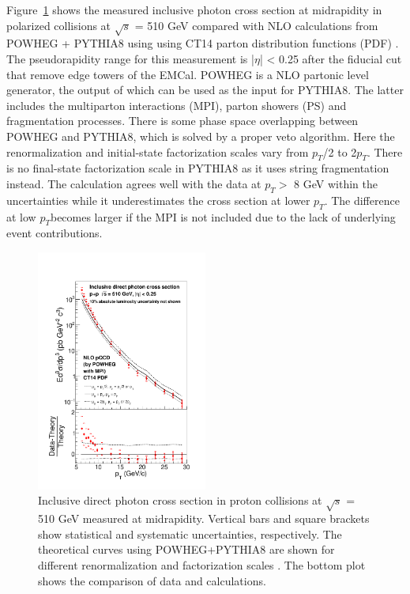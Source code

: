 \documentclass[twocolumn,letterpaper,aps,prl,longbibliography,superscriptaddress,floatfix]{revtex4-2}
\newcommand{\pT}{\ensuremath{p_T}}
\begin{document}
Figure~\ref{fig:inc} shows the measured inclusive photon cross section at midrapidity in polarized collisions at $\sqrt{s}$ = 510 GeV compared with NLO calculations from POWHEG + PYTHIA8 \cite{Nason_2004, Frixione_2007, Alioli2010, Jezo2016, Klasen2018} using using CT14 parton distribution functions (PDF) \cite{PhysRevD.93.033006}. The pseudorapidity range for this measurement is |$\eta$| < 0.25 after the fiducial cut that remove edge towers of the EMCal. POWHEG is a NLO partonic level generator, the output of which can be used as the input for PYTHIA8. The latter includes the multiparton interactions (MPI), parton showers (PS) and fragmentation processes. There is some phase space overlapping between POWHEG and PYTHIA8, which is solved by a proper veto algorithm. Here the renormalization and initial-state factorization scales vary from \pT/2 to 2\pT. There is no final-state factorization scale in PYTHIA8 as it uses string fragmentation instead. The calculation agrees well with the data at $p_T >$ 8 GeV within the uncertainties while it underestimates the cross section at lower \pT. The difference at low \pT becomes larger if the MPI is not included due to the lack of underlying event contributions.

\begin{figure}
\includegraphics[width=0.5\textwidth]{CrossSection-photon-pwhg}
\caption{Inclusive direct photon cross section in proton collisions at $\sqrt{s}$ = 510 GeV measured at midrapidity. Vertical bars and square brackets show statistical and systematic uncertainties, respectively. The theoretical curves using POWHEG+PYTHIA8 are shown for different renormalization and factorization scales \cite{Nason_2004, Frixione_2007, Alioli2010, Jezo2016}. The bottom plot shows the comparison of data and calculations.}
\label{fig:inc}
\end{figure}
\end{document}
